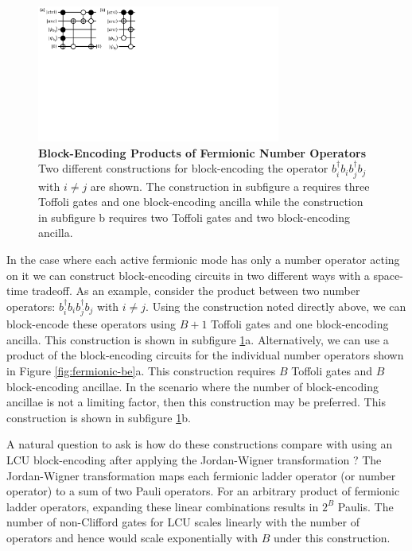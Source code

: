 \begin{figure}[h]
    \includegraphics[width=8cm]{figures/fermionic-number-op-be.pdf}
    \caption{
        \textbf{Block-Encoding Products of Fermionic Number Operators}
        Two different constructions for block-encoding the operator $b_i^\dagger b_i b_j^\dagger b_j$ with $i \neq j$ are shown.
        The construction in subfigure a requires three Toffoli gates and one block-encoding ancilla while the construction in subfigure b requires two Toffoli gates and two block-encoding ancilla.
    }
    \label{fig:fermionic-number-op-be}
\end{figure}


In the case where each active fermionic mode has only a number operator acting on it we can construct block-encoding circuits in two different ways with a space-time tradeoff.
As an example, consider the product between two number operators: $b_i^\dagger b_i b_j^\dagger b_j$ with $i \neq j$.
Using the construction noted directly above, we can block-encode these operators using $B + 1$ Toffoli gates and one block-encoding ancilla.
This construction is shown in subfigure \ref{fig:fermionic-number-op-be}a.
Alternatively, we can use a product of the block-encoding circuits for the individual number operators shown in Figure \ref{fig:fermionic-be}a.
This construction requires $B$ Toffoli gates and $B$ block-encoding ancillae.
In the scenario where the number of block-encoding ancillae is not a limiting factor, then this construction may be preferred.
This construction is shown in subfigure \ref{fig:fermionic-number-op-be}b.

A natural question to ask is how do these constructions compare with using an LCU block-encoding after applying the Jordan-Wigner transformation \cite{}?
The Jordan-Wigner transformation maps each fermionic ladder operator (or number operator) to a sum of two Pauli operators.
For an arbitrary product of fermionic ladder operators, expanding these linear combinations results in $2^{B}$ Paulis.
The number of non-Clifford gates for LCU scales linearly with the number of operators and hence would scale exponentially with $B$ under this construction.

